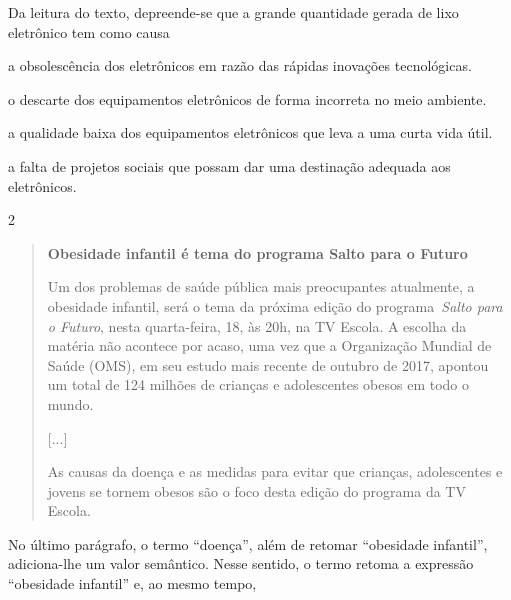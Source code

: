 
Da leitura do texto, depreende-se que a grande quantidade gerada de lixo
eletrônico tem como causa

\begin{escolha}
\item a obsolescência dos eletrônicos em razão das rápidas inovações
tecnológicas.

\item o descarte dos equipamentos eletrônicos de forma incorreta no meio
ambiente.

\item a qualidade baixa dos equipamentos eletrônicos que leva a uma curta
vida útil.

\item a falta de projetos sociais que possam dar uma destinação adequada
aos eletrônicos.
\end{escolha}

\num{2}

\begin{quote}
\textbf{Obesidade infantil é tema do programa Salto para o Futuro}

Um dos problemas de saúde pública mais preocupantes atualmente, a
obesidade infantil, será o tema da próxima edição do
programa~\emph{Salto para o Futuro}, nesta quarta-feira, 18, às 20h, na
TV Escola. A escolha da matéria não acontece por acaso, uma vez que a
Organização Mundial de Saúde (OMS), em seu estudo mais recente de
outubro de 2017, apontou um total de 124 milhões de crianças e
adolescentes obesos em todo o mundo.

{[}...{]}

As causas da doença e as medidas para evitar que crianças, adolescentes
e jovens se tornem obesos são o foco desta edição do programa da TV
Escola.
\end{quote}


No último parágrafo, o termo ``doença'', além de retomar ``obesidade
infantil'', adiciona-lhe um valor semântico. Nesse sentido, o termo
retoma a expressão ``obesidade infantil'' e, ao mesmo tempo,

